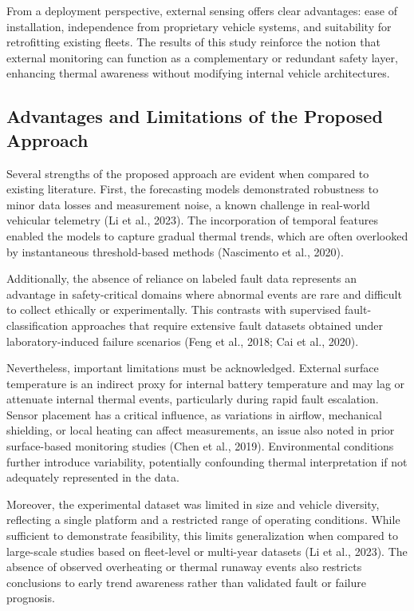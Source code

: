 \documentclass[conference]{IEEEtran}
\begin{document}
From a deployment perspective, external sensing offers clear advantages: ease of installation, independence from proprietary vehicle systems, and suitability for retrofitting existing fleets. The results of this study reinforce the notion that external monitoring can function as a complementary or redundant safety layer, enhancing thermal awareness without modifying internal vehicle architectures.

\subsection{Advantages and Limitations of the Proposed Approach}

Several strengths of the proposed approach are evident when compared to existing literature. First, the forecasting models demonstrated robustness to minor data losses and measurement noise, a known challenge in real-world vehicular telemetry (Li et al., 2023). The incorporation of temporal features enabled the models to capture gradual thermal trends, which are often overlooked by instantaneous threshold-based methods (Nascimento et al., 2020).

Additionally, the absence of reliance on labeled fault data represents an advantage in safety-critical domains where abnormal events are rare and difficult to collect ethically or experimentally. This contrasts with supervised fault-classification approaches that require extensive fault datasets obtained under laboratory-induced failure scenarios (Feng et al., 2018; Cai et al., 2020).

Nevertheless, important limitations must be acknowledged. External surface temperature is an indirect proxy for internal battery temperature and may lag or attenuate internal thermal events, particularly during rapid fault escalation. Sensor placement has a critical influence, as variations in airflow, mechanical shielding, or local heating can affect measurements, an issue also noted in prior surface-based monitoring studies (Chen et al., 2019). Environmental conditions further introduce variability, potentially confounding thermal interpretation if not adequately represented in the data.

Moreover, the experimental dataset was limited in size and vehicle diversity, reflecting a single platform and a restricted range of operating conditions. While sufficient to demonstrate feasibility, this limits generalization when compared to large-scale studies based on fleet-level or multi-year datasets (Li et al., 2023). The absence of observed overheating or thermal runaway events also restricts conclusions to early trend awareness rather than validated fault or failure prognosis.
\end{document}
